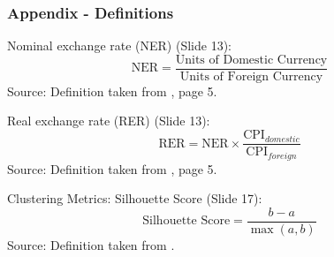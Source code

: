 \begin{frame}
    \frametitle{Appendix - Definitions}

    \begin{block}{Nominal exchange rate (NER) (Slide 13):}
        \begin{equation}
            \text{NER} = \frac{\text{Units of Domestic Currency}}{\text{Units of Foreign Currency}}
        \end{equation}
        \footnotesize{Source: Definition taken from \cite{ca_zorzi_2018_exchange_rate_forecasting}, page 5.}
    \end{block}

    \begin{block}{Real exchange rate (RER) (Slide 13):}
        \begin{equation}
            \text{RER} = \text{NER} \times \frac{\text{CPI}_{domestic}}{\text{CPI}_{foreign}}
        \end{equation}
        \footnotesize{Source: Definition taken from \cite{ca_zorzi_2018_exchange_rate_forecasting}, page 5.}
    \end{block}
    
    \begin{block}{Clustering Metrics: Silhouette Score (Slide 17):}
        \begin{equation}
            \text{Silhouette Score} = \frac{b - a}{\max\left(a, b\right)}
        \end{equation}
        \footnotesize{Source: Definition taken from \cite{sklearn_silhouette_score}.}
    \end{block}
\end{frame}
